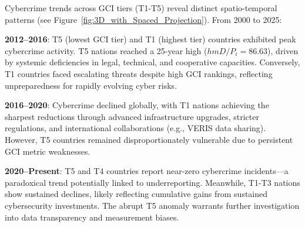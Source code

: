 	Cybercrime trends across GCI tiers (T1-T5) reveal distinct spatio-temporal patterns (see Figure~\ref{fig:3D_with_Spaced_Projection}).
	From 2000 to 2025:

	\textbf{2012–2016}: T5 (lowest GCI tier) and T1 (highest tier) countries exhibited peak cybercrime activity.
	T5 nations reached a 25-year high ($hmD/P_i = 86.63$), driven by systemic deficiencies in legal, technical, and cooperative capacities.
	Conversely, T1 countries faced escalating threats despite high GCI rankings, reflecting unpreparedness for rapidly evolving cyber risks.

	\textbf{2016–2020}: Cybercrime declined globally,
	with T1 nations achieving the sharpest reductions through advanced infrastructure upgrades, stricter regulations, and international collaborations (e.g., VERIS data sharing).
	However, T5 countries remained disproportionately vulnerable due to persistent GCI metric weaknesses.

	\textbf{2020–Present}: T5 and T4 countries report near-zero cybercrime incidents—a paradoxical trend potentially linked to underreporting.
	Meanwhile, T1-T3 nations show sustained declines, likely reflecting cumulative gains from sustained cybersecurity investments.
	The abrupt T5 anomaly warrants further investigation into data transparency and measurement biases.